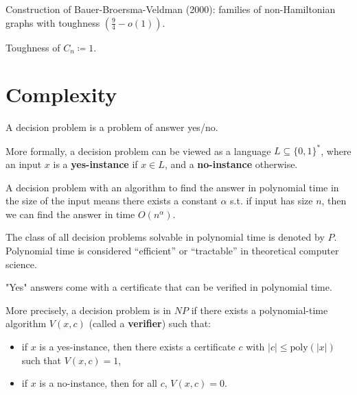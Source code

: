 Construction of Bauer-Broersma-Veldman (2000): families of non-Hamiltonian graphs with toughness \(\left( \frac{9}{4} - o(1) \right) \). 

\begin{note}
    Toughness of \(C_n \coloneqq 1\). 
\end{note}

\section{Complexity}

\begin{definition}
    A decision problem is a problem of answer yes/no.
\end{definition}

\begin{remark}
More formally, a decision problem can be viewed as a language $L \subseteq \{0,1\}^*$, where an input $x$ is a \textbf{yes-instance} if $x \in L$, and a \textbf{no-instance} otherwise.
\end{remark}

\begin{definition}
    A decision problem with an algorithm to find the answer in polynomial time in the size of the input means there exists a constant $\alpha$ s.t. if input has size $n$, then we can find the answer in time $O(n^{\alpha})$.   
\end{definition}

\begin{remark}
The class of all decision problems solvable in polynomial time is denoted by $P$. 
Polynomial time is considered ``efficient'' or ``tractable'' in theoretical computer science.
\end{remark}

\begin{definition}
    "Yes" answers come with a certificate that can be verified in polynomial time.
\end{definition}

\begin{remark}
More precisely, a decision problem is in $NP$ if there exists a polynomial-time algorithm $V(x,c)$ (called a \textbf{verifier}) such that:
\begin{itemize}
    \item if $x$ is a yes-instance, then there exists a certificate $c$ with $|c| \le \text{poly}(|x|)$ such that $V(x,c)=1$,
    \item if $x$ is a no-instance, then for all $c$, $V(x,c)=0$.
\end{itemize}
\end{remark}

